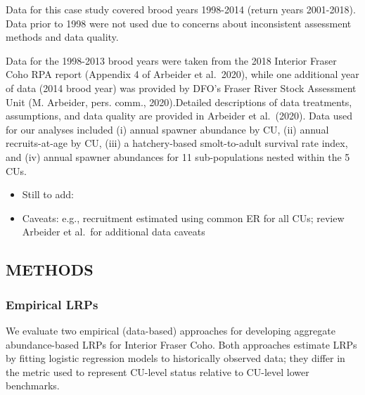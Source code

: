 \documentclass[11pt]{book}
\begin{document}
Data for this case study covered brood years 1998-2014 (return years 2001-2018). Data prior to 1998 were not used due to concerns about inconsistent assessment methods and data quality.

Data for the 1998-2013 brood years were taken from the 2018 Interior Fraser Coho RPA report (Appendix 4 of Arbeider et al.~2020), while one additional year of data (2014 brood year) was provided by DFO's Fraser River Stock Assessment Unit (M. Arbeider, pers. comm., 2020).Detailed descriptions of data treatments, assumptions, and data quality are provided in Arbeider et al.~(2020). Data used for our analyses included (i) annual spawner abundance by CU, (ii) annual recruits-at-age by CU, (iii) a hatchery-based smolt-to-adult survival rate index, and (iv) annual spawner abundances for 11 sub-populations nested within the 5 CUs.
\begin{itemize}

\item
  Still to add:
\item
  Caveats: e.g., recruitment estimated using common ER for all CUs; review Arbeider et al.~for additional data caveats
\end{itemize}
\hypertarget{methods}{%
\subsection{METHODS}\label{methods}}

\hypertarget{empirical-lrps}{%
\subsubsection{Empirical LRPs}\label{empirical-lrps}}

We evaluate two empirical (data-based) approaches for developing aggregate abundance-based LRPs for Interior Fraser Coho. Both approaches estimate LRPs by fitting logistic regression models to historically observed data; they differ in the metric used to represent CU-level status relative to CU-level lower benchmarks.
\end{document}
